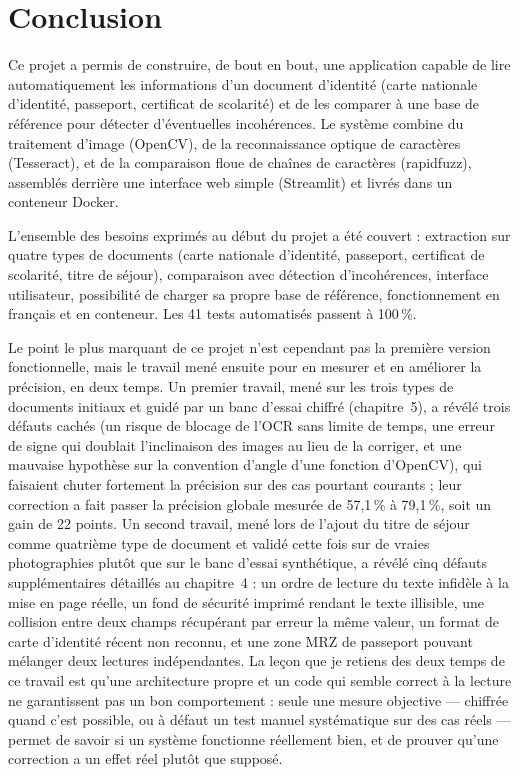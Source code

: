 \chapter*{Conclusion}

Ce projet a permis de construire, de bout en bout, une application capable de lire automatiquement les informations d'un document d'identité (carte nationale d'identité, passeport, certificat de scolarité) et de les comparer à une base de référence pour détecter d'éventuelles incohérences. Le système combine du traitement d'image (OpenCV), de la reconnaissance optique de caractères (Tesseract), et de la comparaison floue de chaînes de caractères (rapidfuzz), assemblés derrière une interface web simple (Streamlit) et livrés dans un conteneur Docker.

L'ensemble des besoins exprimés au début du projet a été couvert : extraction sur quatre types de documents (carte nationale d'identité, passeport, certificat de scolarité, titre de séjour), comparaison avec détection d'incohérences, interface utilisateur, possibilité de charger sa propre base de référence, fonctionnement en français et en conteneur. Les 41 tests automatisés passent à 100\,\%.

Le point le plus marquant de ce projet n'est cependant pas la première version fonctionnelle, mais le travail mené ensuite pour en mesurer et en améliorer la précision, en deux temps. Un premier travail, mené sur les trois types de documents initiaux et guidé par un banc d'essai chiffré (chapitre~5), a révélé trois défauts cachés (un risque de blocage de l'OCR sans limite de temps, une erreur de signe qui doublait l'inclinaison des images au lieu de la corriger, et une mauvaise hypothèse sur la convention d'angle d'une fonction d'OpenCV), qui faisaient chuter fortement la précision sur des cas pourtant courants ; leur correction a fait passer la précision globale mesurée de 57,1\,\% à 79,1\,\%, soit un gain de 22 points. Un second travail, mené lors de l'ajout du titre de séjour comme quatrième type de document et validé cette fois sur de vraies photographies plutôt que sur le banc d'essai synthétique, a révélé cinq défauts supplémentaires détaillés au chapitre~4 : un ordre de lecture du texte infidèle à la mise en page réelle, un fond de sécurité imprimé rendant le texte illisible, une collision entre deux champs récupérant par erreur la même valeur, un format de carte d'identité récent non reconnu, et une zone MRZ de passeport pouvant mélanger deux lectures indépendantes. La leçon que je retiens des deux temps de ce travail est qu'une architecture propre et un code qui semble correct à la lecture ne garantissent pas un bon comportement : seule une mesure objective — chiffrée quand c'est possible, ou à défaut un test manuel systématique sur des cas réels — permet de savoir si un système fonctionne réellement bien, et de prouver qu'une correction a un effet réel plutôt que supposé.

